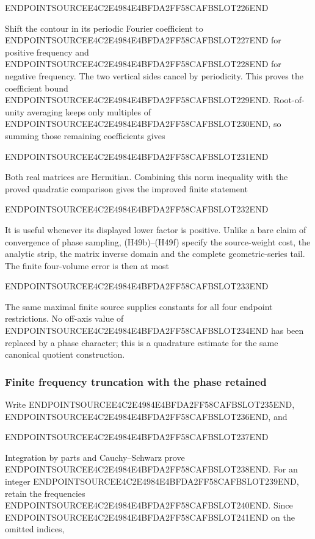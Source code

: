 ENDPOINTSOURCEE4C2E4984E4BFDA2FF58CAFBSLOT226END

Shift the contour in its periodic Fourier coefficient to ENDPOINTSOURCEE4C2E4984E4BFDA2FF58CAFBSLOT227END for positive frequency and ENDPOINTSOURCEE4C2E4984E4BFDA2FF58CAFBSLOT228END for negative frequency. The two vertical sides cancel by periodicity. This proves the coefficient bound ENDPOINTSOURCEE4C2E4984E4BFDA2FF58CAFBSLOT229END. Root-of-unity averaging keeps only multiples of ENDPOINTSOURCEE4C2E4984E4BFDA2FF58CAFBSLOT230END, so summing those remaining coefficients gives

ENDPOINTSOURCEE4C2E4984E4BFDA2FF58CAFBSLOT231END

Both real matrices are Hermitian. Combining this norm inequality with the proved quadratic comparison gives the improved finite statement

ENDPOINTSOURCEE4C2E4984E4BFDA2FF58CAFBSLOT232END

It is useful whenever its displayed lower factor is positive. Unlike a bare claim of convergence of phase sampling, (H49b)--(H49f) specify the source-weight cost, the analytic strip, the matrix inverse domain and the complete geometric-series tail. The finite four-volume error is then at most

ENDPOINTSOURCEE4C2E4984E4BFDA2FF58CAFBSLOT233END

The same maximal finite source supplies constants for all four endpoint restrictions. No off-axis value of ENDPOINTSOURCEE4C2E4984E4BFDA2FF58CAFBSLOT234END has been replaced by a phase character; this is a quadrature estimate for the same canonical quotient construction.

\subsubsection{Finite frequency truncation with the phase retained}\label{endpoint-holonomy_original--finite-frequency-truncation-with-the-phase-retained}

Write ENDPOINTSOURCEE4C2E4984E4BFDA2FF58CAFBSLOT235END, ENDPOINTSOURCEE4C2E4984E4BFDA2FF58CAFBSLOT236END, and

ENDPOINTSOURCEE4C2E4984E4BFDA2FF58CAFBSLOT237END

Integration by parts and Cauchy--Schwarz prove ENDPOINTSOURCEE4C2E4984E4BFDA2FF58CAFBSLOT238END. For an integer ENDPOINTSOURCEE4C2E4984E4BFDA2FF58CAFBSLOT239END, retain the frequencies ENDPOINTSOURCEE4C2E4984E4BFDA2FF58CAFBSLOT240END. Since ENDPOINTSOURCEE4C2E4984E4BFDA2FF58CAFBSLOT241END on the omitted indices,

